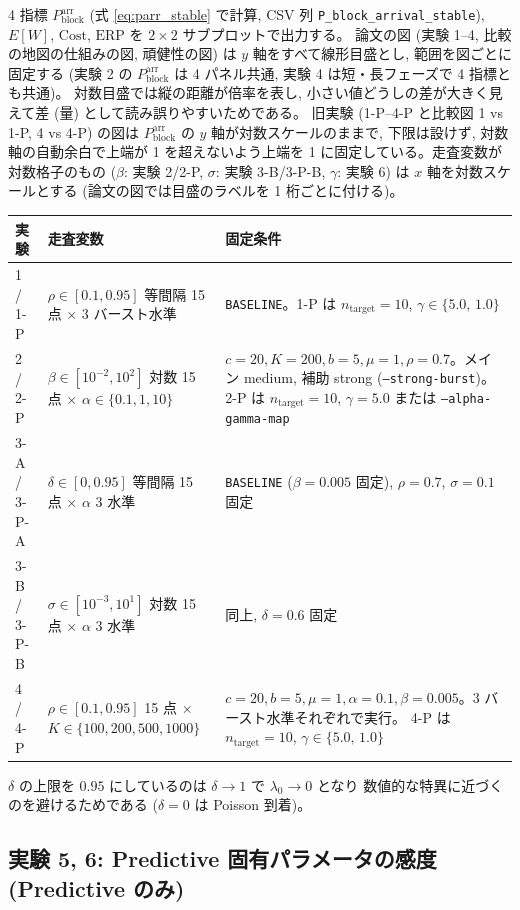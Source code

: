 \documentclass[a4paper,11pt]{article}
\newcommand{\code}[1]{\texttt{#1}}
\newcommand{\blk}{\mathrm{block}}
\begin{document}
4 指標 $P_\blk^{\mathrm{arr}}$ (式 \eqref{eq:parr_stable} で計算,
CSV 列 \code{P\_block\_arrival\_stable}), $E[W]$,
$\mathrm{Cost}$, $\mathrm{ERP}$ を $2\times2$ サブプロットで出力する。
論文の図 (実験 1--4, 比較の地図の仕組みの図, 頑健性の図) は $y$ 軸をすべて線形目盛とし,
範囲を図ごとに固定する (実験 2 の $P_\blk^{\mathrm{arr}}$ は 4 パネル共通, 実験 4 は短・長フェーズで 4 指標とも共通)。
対数目盛では縦の距離が倍率を表し, 小さい値どうしの差が大きく見えて差 (量) として読み誤りやすいためである。
旧実験 (1-P--4-P と比較図 1 vs 1-P, 4 vs 4-P) の図は $P_\blk^{\mathrm{arr}}$ の $y$ 軸が対数スケールのままで,
下限は設けず, 対数軸の自動余白で上端が 1 を超えないよう上端を 1 に固定している。走査変数が対数格子のもの
($\beta$: 実験 2/2-P, $\sigma$: 実験 3-B/3-P-B, $\gamma$: 実験 6) は $x$ 軸を対数スケールとする
(論文の図では目盛のラベルを 1 桁ごとに付ける)。

\begin{longtable}{p{}p{}p{}}
\toprule
実験 & 走査変数 & 固定条件 \\
\midrule
\endhead
1 / 1-P & $\rho\in[0.1,0.95]$ 等間隔 15 点 $\times$ 3 バースト水準
  & \code{BASELINE}。1-P は $n_{\mathrm{target}}=10$, $\gamma\in\{5.0,\,1.0\}$ \\
2 / 2-P & $\beta\in[10^{-2},10^{2}]$ 対数 15 点 $\times$ $\alpha\in\{0.1,1,10\}$
  & $c=20,K=200,b=5,\mu=1,\rho=0.7$。メイン medium, 補助 strong
    (\code{--strong-burst})。2-P は $n_{\mathrm{target}}=10$,
    $\gamma=5.0$ または \code{--alpha-gamma-map} \\
3-A / 3-P-A & $\delta\in[0,0.95]$ 等間隔 15 点 $\times$ $\alpha$ 3 水準
  & \code{BASELINE} ($\beta=0.005$ 固定), $\rho=0.7$, $\sigma=0.1$ 固定 \\
3-B / 3-P-B & $\sigma\in[10^{-3},10^{1}]$ 対数 15 点 $\times$ $\alpha$ 3 水準
  & 同上, $\delta=0.6$ 固定 \\
4 / 4-P & $\rho\in[0.1,0.95]$ 15 点 $\times$ $K\in\{100,200,500,1000\}$
  & $c=20,b=5,\mu=1,\alpha=0.1,\beta=0.005$。3 バースト水準それぞれで実行。
    4-P は $n_{\mathrm{target}}=10$, $\gamma\in\{5.0,\,1.0\}$ \\
\bottomrule
\end{longtable}

$\delta$ の上限を $0.95$ にしているのは $\delta\to1$ で $\lambda_0\to0$ となり
数値的な特異に近づくのを避けるためである ($\delta=0$ は Poisson 到着)。

\subsection{実験 5, 6: Predictive 固有パラメータの感度 (Predictive のみ)}
\end{document}
